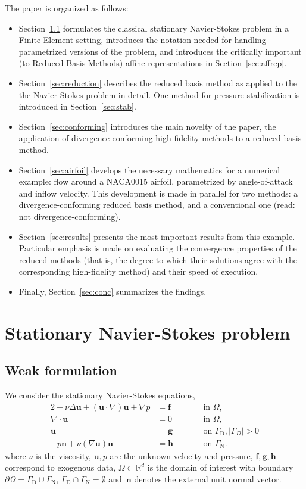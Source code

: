 \documentclass[onecolumn, twoside, a4paper, 11pt]{article}
\begin{document}
The paper is organized as follows:
\begin{itemize}
\item Section~\ref{sec:setting} formulates the classical stationary
  Navier-Stokes problem in a Finite Element setting, introduces the notation
  needed for handling parametrized versions of the problem, and introduces the
  critically important (to Reduced Basis Methods) affine representations in
  Section~\ref{sec:affrep}.
\item Section~\ref{sec:reduction} describes the reduced basis method as applied
  to the the Navier-Stokes problem in detail. One method for pressure
  stabilization is introduced in Section~\ref{sec:stab}.
\item Section~\ref{sec:conforming} introduces the main novelty of the paper, the
  application of divergence-conforming high-fidelity methods to a reduced basis
  method.
\item Section~\ref{sec:airfoil} develops the necessary mathematics for a
  numerical example: flow around a NACA0015 airfoil, parametrized by
  angle-of-attack and inflow velocity. This development is made in parallel for
  two methods: a divergence-conforming reduced basis method, and a conventional
  one (read: not divergence-conforming).
\item Section~\ref{sec:results} presents the most important results from this
  example. Particular emphasis is made on evaluating the convergence properties
  of the reduced methods (that is, the degree to which their solutions agree
  with the corresponding high-fidelity method) and their speed of execution.
\item Finally, Section~\ref{sec:conc} summarizes the findings.
\end{itemize}

\section{Stationary Navier-Stokes problem}

\subsection{Weak formulation}
\label{sec:setting}
We consider the stationary Navier-Stokes equations,
\begin{alignat}{2}
  \label{eqn:ns-1}
  -\nu \Delta \bm u + (\bm u \cdot \nabla) \bm u + \nabla p &= \bm f && \qquad \text{in } \Omega, \\
  \label{eqn:ns-2}
  \nabla \cdot \bm u &= 0 && \qquad \text{in } \Omega, \\
  \label{eqn:ns-3}
  \bm u &= \bm g && \qquad \text{on } \Gamma_\text{D}, |\Gamma_D| > 0 \\
  \label{eqn:ns-4}
  -p \bm n + \nu (\nabla \bm u) \bm n &= \bm h && \qquad \text{on } \Gamma_\text{N}.
\end{alignat}
where $\nu$ is the viscosity, $\bm u, p$ are the unknown velocity and pressure,
$\bm{f},\bm{g},\bm{h}$ correspond to exogenous data,
$\Omega \subset \mathbb R^d$ is the domain of interest with boundary
$\partial \Omega = \Gamma_\text{D} \cup \Gamma_\text{N}$, $\Gamma_\text{D} \cap \Gamma_\text{N} = \emptyset$
and~$\bm{n}$ denotes the external unit normal vector.
\end{document}

